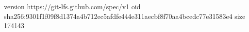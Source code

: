 version https://git-lfs.github.com/spec/v1
oid sha256:9301f1f09f8d1374a4b712ec5afdfe444e311aecbf8f70aa4bcedc77e31583e4
size 174143

